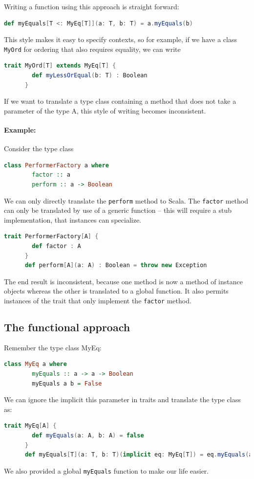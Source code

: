 \documentclass[abstracton,parskip=half]{scrreprt}
\newcommand{\cd}{\texttt}
\newcommand{\ex}{\paragraph{Example:}}
\begin{document}
    Writing a function using this approach is straight forward:
    \begin{lstlisting}[language=Scala,gobble=6]
      def myEquals[T <: MyEq[T]](a: T, b: T) = a.myEquals(b)
    \end{lstlisting}

    This style makes it easy to specify contexts, so for example, if we have
    a class \cd{MyOrd} for ordering that also requires equality, we can write
    \begin{lstlisting}[language=Scala,gobble=6]
      trait MyOrd[T] extends MyEq[T] {
        def myLessOrEqual(b: T) : Boolean
      }
    \end{lstlisting}

    If we want to translate a type class containing a method that does not take a
    parameter of the type A, this style of writing becomes inconsistent.

    \ex Consider the type class
    \begin{lstlisting}[language=Haskell,gobble=6]
      class PerformerFactory a where
        factor :: a
        perform :: a -> Boolean
    \end{lstlisting}
    We can only directly translate the \cd{perform} method to Scala. The \cd{factor}
    method can only be translated by use of a generic function -- this will
    require a stub implementation, that instances can specialize.
    \begin{lstlisting}[language=Scala,gobble=6]
      trait PerformerFactory[A] {
        def factor : A
      }
      def perform[A](a: A) : Boolean = throw new Exception
    \end{lstlisting}
    The end result is inconsistent, because one method is now a method of
    instance objects whereas the other is translated to a global function. It
    also permits instances of the trait that only implement the \cd{factor}
    method.
    \subsection{The functional approach}
    Remember the type class MyEq:
    \begin{lstlisting}[language=Haskell,gobble=6]
      class MyEq a where
        myEquals :: a -> a -> Boolean
        myEquals a b = False
    \end{lstlisting}
    We can ignore the implicit this parameter in traits and translate the type
    class as:
    \begin{lstlisting}[language=Scala,gobble=6]
      trait MyEq[A] {
        def myEquals(a: A, b: A) = false
      }
      def myEquals[T](a: T, b: T)(implicit eq: MyEq[T]) = eq.myEquals(a, b)
    \end{lstlisting}
    We also provided a global \cd{myEquals} function to make our life easier.
\end{document}
